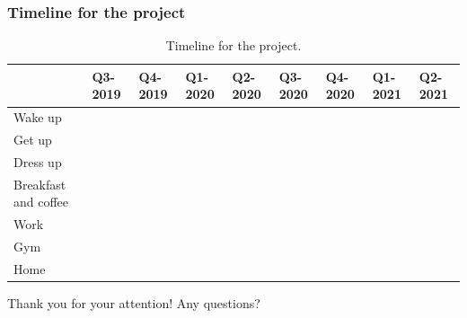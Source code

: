 \documentclass[10pt,xcolor=table]{beamer}
\begin{document}
\begin{frame}
  \frametitle{Timeline for the project}
\begin{table}[tp]
  \caption{Timeline for the project.}
  \label{table:timeline}
  \begin{adjustwidth}{-0.15in}{0.0in}
    \centering
    \footnotesize
    \begin{tabular}{|l|l|l|l|l|l|l|l|l|}
      \hline
      & \textbf{Q3-2019}                  & \textbf{Q4-2019}                 & \textbf{Q1-2020} & \textbf{Q2-2020} & \textbf{Q3-2020} & \textbf{Q4-2020}      & \textbf{Q1-2021}      & \textbf{Q2-2021}     \\ \hline
      Wake up           & \multicolumn{2}{l|}{\cellcolor[HTML]{34FF34}{\color[HTML]{000000} }} &                  &                  &                  &                       &                       &                      \\ \hline
      Get up           & \multicolumn{2}{l|}{\cellcolor[HTML]{38FFF8}{\color[HTML]{000000} }} &                  &                  &                  &                       &                       &                      \\ \hline
      Dress up &                                   & \multicolumn{2}{l|}{\cellcolor[HTML]{3531FF}}       &                  &                  &                       &                       &                      \\ \hline
      Breakfast and coffee          &                                   &                                  & \multicolumn{3}{l|}{\cellcolor[HTML]{6200C9}}          &                       &                       &                      \\ \hline
      Work        &                                   &                                  & \multicolumn{3}{l|}{\cellcolor[HTML]{F8A102}}          &                       &                       &                      \\ \hline
      Gym    &                                   &                                  &                  &                  & \multicolumn{3}{l|}{\cellcolor[HTML]{FD6864}}                    &                      \\ \hline
      Home                  &                                   &                                  &                  &                  &                  & \multicolumn{3}{l|}{\cellcolor[HTML]{CB0000}{\color[HTML]{000000} }} \\ \hline
    \end{tabular}    
  \end{adjustwidth}
\end{table}  
\end{frame}

\begin{frame}{\Large Thank you for your attention!}
  \centering \Large Any questions?
\end{frame}
\end{document}
